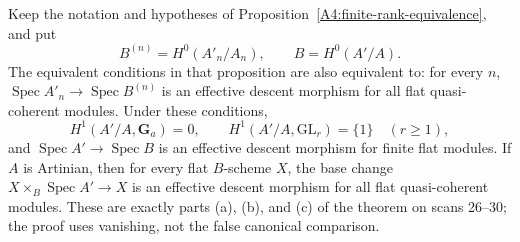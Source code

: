 \begin{theorem}
\label{A4:finite-descent-theorem}
Keep the notation and hypotheses of
Proposition~\ref{A4:finite-rank-equivalence}, and put
\[
 B^{(n)}=H^0(A'_n/A_n),\qquad B=H^0(A'/A).
\]
The equivalent conditions in that proposition are also equivalent to:
for every $n$, $\operatorname{Spec}A'_n\to\operatorname{Spec}B^{(n)}$
is an effective descent morphism for all flat quasi-coherent modules.
Under these conditions,
\[
 H^1(A'/A,\mathbf G_a)=0,\qquad
 H^1(A'/A,\mathrm{GL}_r)=\{1\}\quad(r\geq1),
\]
and $\operatorname{Spec}A'\to\operatorname{Spec}B$ is an effective
descent morphism for finite flat modules.
If $A$ is Artinian, then for every flat $B$-scheme $X$, the base change
$X\times_B\operatorname{Spec}A'\to X$ is an effective descent morphism
for all flat quasi-coherent modules.
These are exactly parts (a), (b), and (c) of the theorem on scans 26--30;
the proof uses vanishing, not the false canonical comparison.
\end{theorem}

